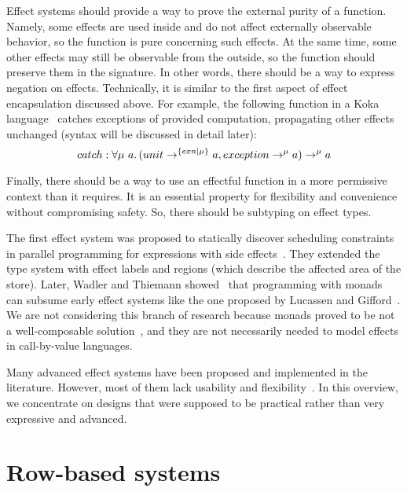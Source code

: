 \documentclass[conference]{IEEEtran}
\newcommand{\ap}{~}
\begin{document}
    Effect systems should provide a way to prove the external purity of a function.
    Namely, some effects are used inside and do not affect externally observable behavior, so the function is pure concerning such effects.
    At the same time, some other effects may still be observable from the outside, so the function should preserve them in the signature.
    In other words, there should be a way to express negation on effects.
    Technically, it is similar to the first aspect of effect encapsulation discussed above.
    For example, the following function in a Koka language~\cite{leijen2014koka, leijen2017type} catches exceptions of provided computation, propagating other effects unchanged (syntax will be discussed in detail later):
    \[catch : \forall \mu\ap a\ldotp (unit\to^{\{exn|\mu\}} a, exception \to^{\mu} a) \to^\mu a\]

    Finally, there should be a way to use an effectful function in a more permissive context than it requires.
    It is an essential property for flexibility and convenience without compromising safety.
    So, there should be subtyping on effect types.


    The first effect system was proposed to statically discover scheduling constraints in parallel programming for expressions with side effects~\cite{lucassen1988polymorphic}.
    They extended the type system with effect labels and regions (which describe the affected area of the store).
    Later, Wadler and Thiemann showed~\cite{wadler2003marriage} that programming with monads~\cite{moggi1988computational} can subsume early effect systems like the one proposed by Lucassen and Gifford~\cite{lucassen1988polymorphic}.
    We are not considering this branch of research because monads proved to be not a well-composable solution~\cite{liang1995monad, kiselyov2013extensible}, and they are not necessarily needed to model effects in call-by-value languages.

    Many advanced effect systems have been proposed and implemented in the literature.
    However, most of them lack usability and flexibility~\cite{odersky2022scoped}.
    In this overview, we concentrate on designs that were supposed to be practical rather than very expressive and advanced.


    \section{Row-based systems} \label{sec:rows}
\end{document}
